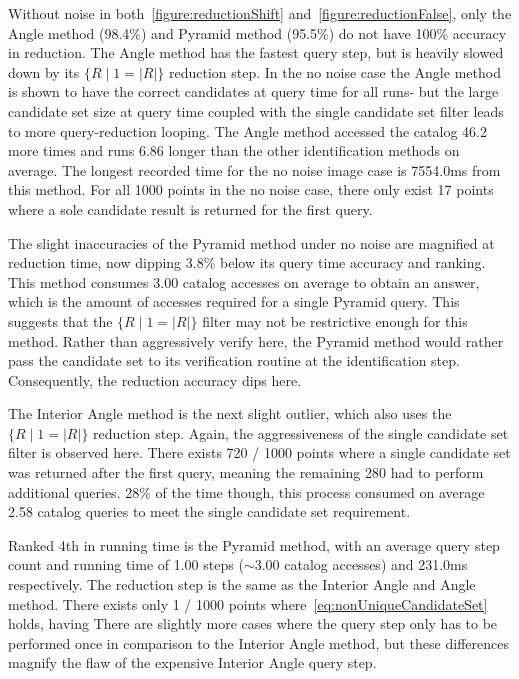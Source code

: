 Without noise in both~\autoref{figure:reductionShift} and~\autoref{figure:reductionFalse}, only the Angle method
(98.4\%) and Pyramid method (95.5\%) do not have 100\% accuracy in reduction.
The Angle method has the fastest query step, but is heavily slowed down by its $\{ R \mid 1 = |R|\}$ reduction step.
In the no noise case the Angle method is shown to have the correct candidates at query time for all runs- but
the large candidate set size at query time coupled with the single candidate set filter leads to more query-reduction
looping.
The Angle method accessed the catalog 46.2 more times and runs 6.86 longer than the other identification methods on
average.
The longest recorded time for the no noise image case is 7554.0ms from this method.
For all 1000 points in the no noise case, there only exist 17 points where a sole candidate result is returned for the
first query.

The slight inaccuracies of the Pyramid method under no noise are magnified at reduction time, now dipping 3.8\% below
its query time accuracy and ranking.
This method consumes 3.00 catalog accesses on average to obtain an answer, which is the amount of accesses required
for a single Pyramid query.
This suggests that the $\{ R \mid 1 = |R|\}$ filter may not be restrictive enough for this method.
Rather than aggressively verify here, the Pyramid method would rather pass the candidate set to its verification routine
 at the identification step.
Consequently, the reduction accuracy dips here.

The Interior Angle method is the next slight outlier, which also uses the $\{ R \mid 1 = |R| \}$ reduction step.
Again, the aggressiveness of the single candidate set filter is observed here.
There exists 720 / 1000 points where a single candidate set was returned after the first query, meaning the remaining
280 had to perform additional queries.
28\% of the time though, this process consumed on average 2.58 catalog queries to meet the single candidate set
requirement.

Ranked 4th in running time is the Pyramid method, with an average query step count and running time of 1.00 steps
($\sim$3.00 catalog accesses) and 231.0ms respectively.
The reduction step is the same as the Interior Angle and Angle method.
There exists only 1 / 1000 points where~\autoref{eq:nonUniqueCandidateSet} holds, having
There are slightly more cases where the query step only has to be performed once in comparison to the Interior Angle method,
but these differences magnify the flaw of the expensive Interior Angle query step.

